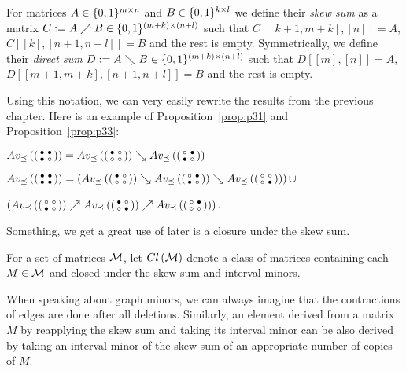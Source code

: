 \begin{defn}
For matrices $A\in\{0,1\}^{m\times n}$ and $B\in\{0,1\}^{k\times l}$ we define their \emph{skew sum} as a matrix $C:=A\nearrow B\in\{0,1\}^{(m+k)\times(n+l)}$ such that $C[[k+1,m+k],[n]]=A$, $C[[k],[n+1,n+l]]=B$ and the rest is empty. Symmetrically, we define their \emph{direct sum} $D:=A\searrow B\in\{0,1\}^{(m+k)\times(n+l)}$ such that $D[[m],[n]]=A$, $D[[m+1,m+k],[n+1,n+l]]=B$ and the rest is empty.
\end{defn}

Using this notation, we can very easily rewrite the results from the previous chapter. Here is an example of Proposition~\ref{prop:p31} and Proposition~\ref{prop:p33}:

\begin{prop}
$Av_{\preceq}\left(\left(\begin{smallmatrix}\bullet&\bullet\\\bullet&\circ\end{smallmatrix}\right)\right)=Av_{\preceq}\left(\left(\begin{smallmatrix}\bullet&\circ\\\circ&\circ\end{smallmatrix}\right)\right)\searrow Av_{\preceq}\left(\left(\begin{smallmatrix}\circ&\bullet\\\bullet&\circ\end{smallmatrix}\right)\right)$
\end{prop}

\begin{prop}
$Av_{\preceq}\left(\left(\begin{smallmatrix}\bullet&\bullet\\\bullet&\bullet\end{smallmatrix}\right)\right)=\left(Av_{\preceq}\left(\left(\begin{smallmatrix}\bullet&\circ\\\circ&\circ\end{smallmatrix}\right)\right)\searrow Av_{\preceq}\left(\left(\begin{smallmatrix}\circ&\bullet\\\bullet&\circ\end{smallmatrix}\right)\right)\searrow Av_{\preceq}\left(\left(\begin{smallmatrix}\circ&\circ\\\circ&\bullet\end{smallmatrix}\right)\right)\right)\cup$

\hspace{54mm}$\left(Av_{\preceq}\left(\left(\begin{smallmatrix}\circ&\circ\\\bullet&\circ\end{smallmatrix}\right)\right)\nearrow Av_{\preceq}\left(\left(\begin{smallmatrix}\bullet&\circ\\\circ&\bullet\end{smallmatrix}\right)\right)\nearrow Av_{\preceq}\left(\left(\begin{smallmatrix}\circ&\bullet\\\circ&\circ\end{smallmatrix}\right)\right)\right)$.
\end{prop}

Something, we get a great use of later is a closure under the skew sum.

\begin{defn}
For a set of matrices $\mathcal{M}$, let $Cl\left(\mathcal{M}\right)$ denote a class of matrices containing each $M\in\mathcal{M}$ and closed under the skew sum and interval minors.
\end{defn}

When speaking about graph minors, we can always imagine that the contractions of edges are done after all deletions. Similarly, an element derived from a matrix~$M$ by reapplying the skew sum and taking its interval minor can be also derived by taking an interval minor of the skew sum of an appropriate number of copies of $M$.

